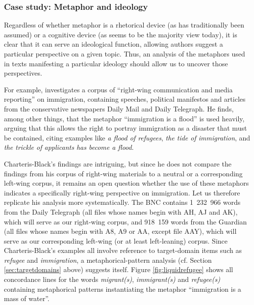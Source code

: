 \subsubsection{Case study: Metaphor and ideology}
\label{sec:metaphorandideology}

Regardless of whether metaphor is a rhetorical device (as has traditionally been assumed) or a cognitive device (as seems to be the majority view today), it is clear that it can serve an ideological function, allowing authors suggest a particular perspective on a given topic. Thus, an analysis of the metaphors used in texts manifesting a particular ideology should allow us to uncover those perspectives.

For example, \citet{charteris-black_politicians_2005} investigates a corpus of ``right-wing communication and media reporting'' on immigration, containing speeches, political manifestos and articles from the conservative newspapers Daily Mail and Daily Telegraph. He finds, among other things, that the metaphor ``immigration is a flood'' is used heavily, arguing that this allows the right to portray immigration as a disaster that must be contained, citing examples like \textit{a flood of refugees}, \textit{the tide of immigration}, and \textit{the trickle of applicants has become a flood}.

Charteris-Black's findings are intriguing, but since he does not compare the findings from his corpus of right-wing materials to a neutral or a corresponding left-wing corpus, it remains an open question whether the use of these metaphors indicates a specifically right-wing perspective on immigration. Let us therefore replicate his analysis more systematically. The BNC contains 1~232~966 words from the Daily Telegraph (all files whose names begin with AH, AJ and AK), which will serve as our right-wing corpus, and 918~159 words from the Guardian (all files whose names begin with A8, A9 or AA, except file AAY), which will serve as our corresponding left-wing (or at least left-leaning) corpus. Since Charteris-Black's examples all involve reference to target-domain items such as \textit{refugee} and \textit{immigration}, a metaphorical-pattern analysis (cf. Section \ref{sec:targetdomains} above) suggests itself. Figure \ref{fig:liquidrefugee} shows all concordance lines for the words \textit{migrant(s)}, \textit{immigrant(s)} and \textit{refugee(s)} containing metaphorical patterns instantiating the metaphor ``immigration is a mass of water''.

